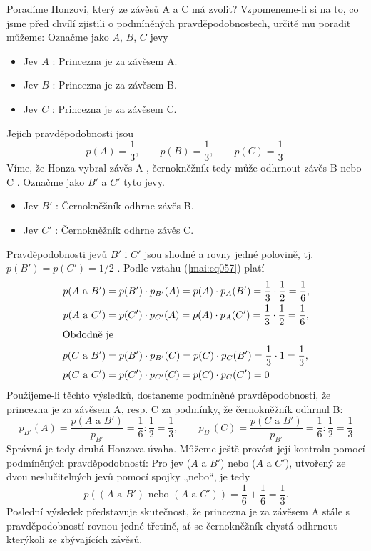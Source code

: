 \begin{example}
  Poradíme Honzovi, který ze závěsů A a C má zvolit? Vzpomeneme-li si na to, co jsme před chvílí 
  zjistili o podmíněných pravděpodobnostech, určitě mu poradit můžeme: Označme jako \(A\), \(B\), 
  \(C\) jevy
  \begin{itemize}
    \item Jev \(A\) : Princezna je za závěsem A.
    \item Jev \(B\) : Princezna je za závěsem B.
    \item Jev \(C\) : Princezna je za závěsem C.
  \end{itemize}
  Jejich pravděpodobnosti jsou
  \begin{equation*}
    p(A) = \dfrac{1}{3}, \qquad p(B) = \dfrac{1}{3}, \qquad p(C) = \dfrac{1}{3}.
  \end{equation*}
  Víme, že Honza vybral závěs A , černokněžník tedy může odhrnout závěs B nebo C . Označme jako 
  \(B'\) a \(C'\) tyto jevy.
  \begin{itemize}
    \item Jev \(B'\) : Černokněžník odhrne závěs B.
    \item Jev \(C'\) : Černokněžník odhrne závěs C.
  \end{itemize}
  Pravděpodobnosti jevů \(B'\) i \(C'\) jsou shodné a rovny jedné polovině, tj. \(p(B') = p(C') = 
  1/2\) . Podle vztahu (\ref{mai:eq057}) platí
  \begin{align*}
    p(A\text{ a }B') &= p(B')\cdot p_{B'}(A) = p(A)\cdot p_{A}(B') 
                      = \dfrac{1}{3}\cdot\dfrac{1}{2} = \dfrac{1}{6},  \\
    p(A\text{ a }C') &= p(C')\cdot p_{C'}(A) = p(A)\cdot p_{A}(C')
                      = \dfrac{1}{3}\cdot\dfrac{1}{2} = \dfrac{1}{6},  \\
    \shortintertext{Obdodně je}
    p(C\text{ a }B') &= p(B')\cdot p_{B'}(C) = p(C)\cdot p_{C}(B')
                      = \dfrac{1}{3}\cdot1 = \dfrac{1}{3},              \\
    p(C\text{ a }C') &= p(C')\cdot p_{C'}(C) = p(C)\cdot p_{C}(C') = 0  \\
  \end{align*}
  Použijeme-li těchto výsledků, dostaneme podmíněné pravděpodobnosti, že princezna je za závěsem A, 
  resp. C za podmínky, že černokněžník odhrnul B:
  \begin{equation*}
    p_{B'}(A) = \dfrac{p(A\text{ a }B')}{p_{B'}} = \dfrac{1}{6}:\dfrac{1}{2} = \dfrac{1}{3},  \qquad
    p_{B'}(C) = \dfrac{p(C\text{ a }B')}{p_{B'}} = \dfrac{1}{6}:\dfrac{1}{2} = \dfrac{1}{3}    
  \end{equation*}
  Správná je tedy druhá Honzova úvaha. Můžeme ještě provést její kontrolu pomocí podmíněných 
  pravděpodobností: Pro jev (\(A\) a \(B'\)) nebo (\(A\) a \(C'\)), utvořený ze dvou neslučitelných 
  jevů pomocí spojky „nebo“, je tedy
  \begin{equation*}
    p\left((A\text{ a }B')\text{ nebo }(A\text{ a }C')\right) = \dfrac{1}{6} + \dfrac{1}{6} 
      = \dfrac{1}{3}.
  \end{equation*}
  Poslední výsledek představuje skutečnost, že princezna je za závěsem A stále s pravděpodobností 
  rovnou jedné třetině, ať se černokněžník chystá odhrnout kterýkoli ze zbývajících závěsů.
\normalsize
\end{example}